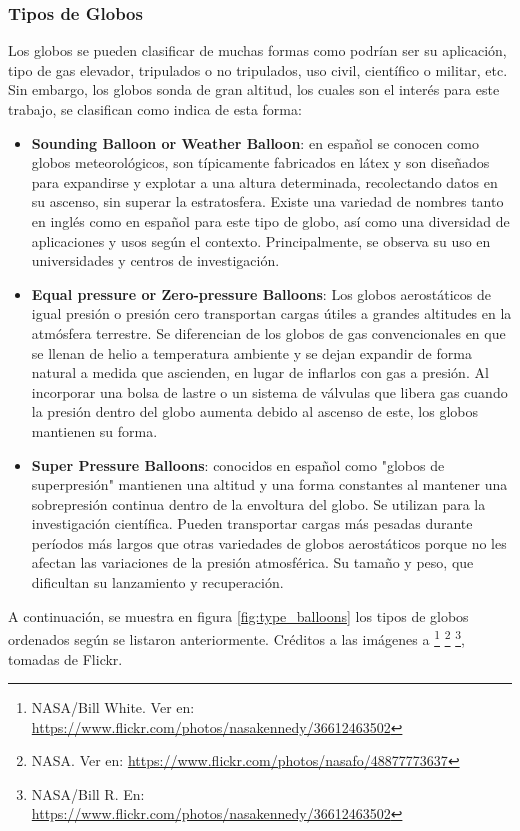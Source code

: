 \subsubsection{Tipos de Globos} \label{tipos_globo}

Los globos se pueden clasificar de muchas formas como podrían ser su aplicación, tipo de gas elevador, tripulados o no tripulados, uso civil, científico o militar, etc. Sin embargo, los globos sonda de gran altitud, los cuales son el interés para este trabajo,  se clasifican como indica \cite{type_balloon_NASA, history_type_balloon, just_type_balloon} de esta forma:  

\begin{itemize}
    \item \textbf{Sounding Balloon or Weather Balloon}: en español se conocen como globos meteorológicos, son típicamente fabricados en látex y son diseñados para expandirse y explotar a una altura determinada, recolectando datos en su ascenso, sin superar la estratosfera.  Existe una variedad de nombres tanto en inglés como en español para este tipo de globo, así como una diversidad de aplicaciones y usos según el contexto. Principalmente, se observa su uso en universidades y centros de investigación. 
    \item \textbf{Equal pressure or Zero-pressure Balloons}: Los globos aerostáticos de igual presión o presión cero transportan cargas útiles a grandes altitudes en la atmósfera terrestre. Se diferencian de los globos de gas convencionales en que se llenan de helio a temperatura ambiente y se dejan expandir de forma natural a medida que ascienden, en lugar de inflarlos con gas a presión. Al incorporar una bolsa de lastre o un sistema de válvulas que libera gas cuando la presión dentro del globo aumenta debido al ascenso de este, los globos mantienen su forma.
    \item \textbf{Super Pressure Balloons}: conocidos en español como "globos de superpresión" mantienen una altitud y una forma constantes al mantener una sobrepresión continua dentro de la envoltura del globo. Se utilizan para la investigación científica. Pueden transportar cargas más pesadas durante períodos más largos que otras variedades de globos aerostáticos porque no les afectan las variaciones de la presión atmosférica. Su tamaño y peso, que dificultan su lanzamiento y recuperación.
\end{itemize}

A continuación, se muestra en figura \ref{fig:type_balloons} los tipos de globos ordenados según se listaron anteriormente. Créditos a las imágenes a \footnote{NASA/Bill White. Ver en: \url{https://www.flickr.com/photos/nasakennedy/36612463502}} \footnote{NASA. Ver en: \url{https://www.flickr.com/photos/nasafo/48877773637}} \footnote{NASA/Bill R. En: \url{https://www.flickr.com/photos/nasakennedy/36612463502}}, tomadas de Flickr.

